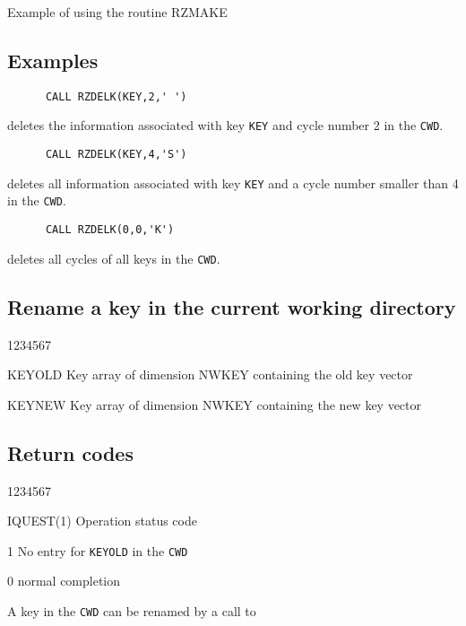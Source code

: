 \begin{XMPt}{Example of using the routine RZMAKE}
\subsection{Examples}
\begin{verbatim}
      CALL RZDELK(KEY,2,' ')
\end{verbatim}
deletes the information associated with key {\tt KEY} and cycle number 2 in
the {\tt CWD}.
\begin{verbatim}
      CALL RZDELK(KEY,4,'S')
\end{verbatim}
deletes all information associated with key {\tt KEY}
and a cycle number smaller than 4 in the {\tt CWD}.
\begin{verbatim}
      CALL RZDELK(0,0,'K')
\end{verbatim}
deletes all cycles of all keys in the {\tt CWD}.
\subsection{Rename a key in the current working directory}
\Idesc
\begin{DLtt}{1234567}
\item[KEYOLD]Key array of dimension NWKEY containing the old key vector
\item[KEYNEW]Key array of dimension NWKEY containing the new key vector
\end{DLtt}
\subsection{Return codes}
\par
\begin{DLtt}{1234567}
\item[IQUEST(1)]Operation status code
\begin{DLtt}{12}
\item[1]No entry for {\tt KEYOLD} in the {\tt CWD}
\item[0]normal completion
\end{DLtt}
\end{DLtt}
\par 
A key in the {\tt CWD} can be renamed by a call to 

\end{XMPt}
